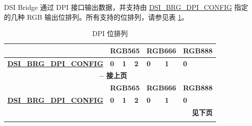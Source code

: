 \documentclass[main\_\_CN.tex]{subfiles}
\begin{document}
DSI Bridge 通过 DPI 接口输出数据，并支持由 \hyperref[fielddesc:DSIBRGDPICONFIG]{DSI\_BRG\_DPI\_CONFIG} 指定的几种 RGB 输出位排列。所有支持的位排列，请参见表 \ref{tab:dpi-bit-arrangement}。

\scriptsize
\begin{longtable}[c]{ |p{2.5cm}|p{1cm}|p{1cm}|p{1cm}|p{1cm}|p{1cm}|p{1cm}| }
    \caption{DPI 位排列}
    \label{tab:dpi-bit-arrangement}\\\hline

    \rowcolor{lightgray}
    \textbf{} & \multicolumn{3}{|c|}{\textbf{RGB565}} & \multicolumn{2}{|c|}{\textbf{RGB666}} & \textbf{RGB888}  \\\hline
    \rowcolor{lightgray}
    \textbf{\hyperref[fielddesc:DSIBRGDPICONFIG]{DSI\_BRG\_DPI\_CONFIG}} & \textbf{0} & \textbf{1} & \textbf{2} & \textbf{0} & \textbf{1} & \textbf{0}  \\\hline
    \endfirsthead


    \multicolumn{7}{c}{\bfseries \tablename\ \thetable{} -- 接上页}\\\hline
    \rowcolor{lightgray}
    \textbf{} & \multicolumn{3}{|c|}{\textbf{RGB565}} & \multicolumn{2}{|c|}{\textbf{RGB666}} & \textbf{RGB888}  \\\hline
    \rowcolor{lightgray}
    \textbf{\hyperref[fielddesc:DSIBRGDPICONFIG]{DSI\_BRG\_DPI\_CONFIG}} & \textbf{0} & \textbf{1} & \textbf{2} & \textbf{0} & \textbf{1} & \textbf{0} \\\hline
    \endhead

    \multicolumn{7}{r}{\textbf{见下页}} \\
    \endfoot

    \endlastfoot
        

\end{longtable}
\end{document}
